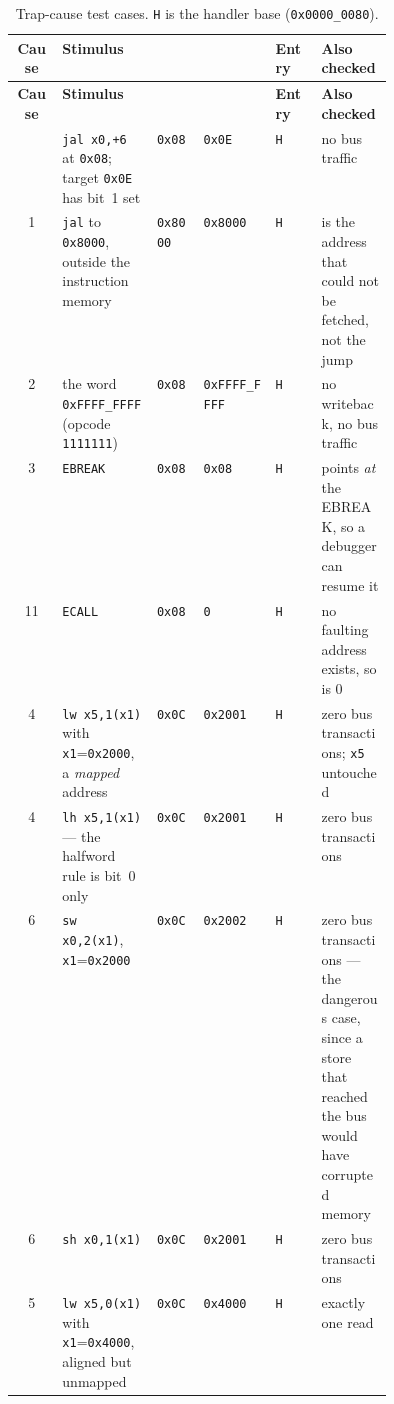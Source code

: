 {\small
\begin{longtable}{@{}cL{0.25\linewidth}lllL{0.19\linewidth}@{}}
\caption{Trap-cause test cases. \texttt{H} is the handler base (\texttt{0x0000\_0080}).}
\label{tab:trapcases}\\
\toprule
\textbf{Cause} & \textbf{Stimulus} &  &  & \textbf{Entry} & \textbf{Also checked} \\
\midrule
\endfirsthead
\toprule
\textbf{Cause} & \textbf{Stimulus} &  &  & \textbf{Entry} & \textbf{Also checked} \\
\midrule
\endhead
\bottomrule
\endfoot
\bottomrule
{}  & \texttt{jal x0,+6} at \texttt{0x08}; target \texttt{0x0E} has bit~1 set
   & \texttt{0x08} & \texttt{0x0E} & \texttt{H} & no bus traffic \\
1  & \texttt{jal} to \texttt{0x8000}, outside the instruction memory
   & \texttt{0x8000} & \texttt{0x8000} & \texttt{H} &  is the address
     that could not be fetched, not the jump \\
2  & the word \texttt{0xFFFF\_FFFF} (opcode \texttt{1111111})
   & \texttt{0x08} & \texttt{0xFFFF\_FFFF} & \texttt{H} & no writeback,
     no bus traffic \\
3  & \texttt{EBREAK}
   & \texttt{0x08} & \texttt{0x08} & \texttt{H} &  points \emph{at}
     the EBREAK, so a debugger can resume it \\
11 & \texttt{ECALL}
   & \texttt{0x08} & \texttt{0} & \texttt{H} & no faulting address exists, so
      is 0 \\
4  & \texttt{lw x5,1(x1)} with \texttt{x1}=\texttt{0x2000}, a \emph{mapped}
     address & \texttt{0x0C} & \texttt{0x2001} & \texttt{H} & zero bus
     transactions; \texttt{x5} untouched \\
4  & \texttt{lh x5,1(x1)} --- the halfword rule is bit~0 only
   & \texttt{0x0C} & \texttt{0x2001} & \texttt{H} & zero bus transactions \\
6  & \texttt{sw x0,2(x1)}, \texttt{x1}=\texttt{0x2000}
   & \texttt{0x0C} & \texttt{0x2002} & \texttt{H} & zero bus transactions ---
     the dangerous case, since a store that reached the bus would have corrupted
     memory \\
6  & \texttt{sh x0,1(x1)}
   & \texttt{0x0C} & \texttt{0x2001} & \texttt{H} & zero bus transactions \\
5  & \texttt{lw x5,0(x1)} with \texttt{x1}=\texttt{0x4000}, aligned but unmapped
   & \texttt{0x0C} & \texttt{0x4000} & \texttt{H} & exactly one read

\end{longtable}}
